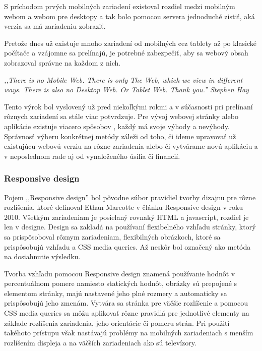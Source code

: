 S príchodom prvých mobilných zariadení existoval rozdiel medzi mobilným webom a webom pre desktopy a tak bolo pomocou servera jednoduché zistiť, aká verzia sa má zariadeniu zobraziť.

Pretože dnes už existuje mnoho zariadení od mobilných cez tablety až po klasické počítače a vzájomne sa prelínajú, je potrebné zabezpečiť, aby sa webový obsah zobrazoval správne na každom z nich.

\begin{fancybox}
\textit{,,There is no Mobile Web. There is only The Web, which we view in different ways. There is also no Desktop Web. Or Tablet Web. Thank you.'' Stephen Hay} \cite{noMobileWeb}
\end{fancybox}

Tento výrok bol vyslovený už pred niekoľkými rokmi a v súčasnosti pri prelínaní rôznych zariadení sa stále viac potvrdzuje. Pre vývoj webovej stránky alebo aplikácie existuje viacero spôsobov \cite{mobiforge}, každý má svoje výhody a nevýhody. Správnosť výberu konkrétnej metódy záleži od toho, či ideme upravovať už existujúcu webovú verziu na rôzne zariadenia alebo či vytvárame novú aplikáciu a v neposlednom rade aj od vynaloženého úsilia či financií.


\subsubsection{Responsive design} %
\label{ssub:responsive_design}

Pojem ,,Responsive design'' bol pôvodne súbor pravidiel tvorby dizajnu pre rôzne rozlíšenia, ktoré definoval Ethan Marcotte v článku Responsive design v roku 2010. Všetkým zariadeniam je posielaný rovnaký HTML a javascript, rozdiel je len v designe. Design sa zakladá na používaní flexibelného vzhľadu stránky, ktorý sa prispôsoboval rôznym zariadeniam, flexibilných obrázkoch, ktoré sa prispôsobujú vzhľadu a CSS media queries. \cite{responsive, mediaqueries} Až neskôr bol označený ako metóda na dosiahnutie výsledku.

Tvorba vzhľadu pomocou Responsive design znamená používanie hodnôt v percentuálnom pomere namiesto statických hodnôt, obrázky sú prepojené s elementom stránky, majú nastavené jeho plné rozmery a automaticky sa prispôsobujú jeho zmenám. Vytvára sa stránka pre väčšie rozlíšenie a pomocou CSS media queries sa môžu aplikovať rôzne pravidlá pre jednotlivé elementy na základe rozlíšenia zariadenia, jeho orientácie či pomeru strán. Pri použití takéhoto prístupu však nastávajú problémy na mobilných zariadeniach s menším rozlíšením displeja a na väčších zariadeniach ako sú televízory.\\


